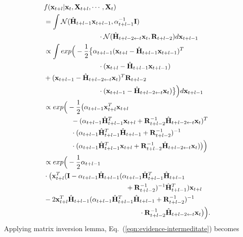 \documentclass[journal]{IEEEtran}
\begin{document}
\begin{equation}\label{eqn:evidence-intermeditate}
    \begin{aligned}&f({\bf{x}}_{t+l}|{\bf{x}}_t,{\bf{X}}_{t+l},\cdots,{\bf{X}}_t)\\
&=\int \mathcal{N}(\hat {\bf{H}}_{t+l-1}{\bf{x}}_{t+l-1},\alpha_{t+l-1}^{-1}{\bf{I}})
\\&\qquad\qquad\qquad\qquad\cdot\mathcal{N}(\hat {\bf{H}}_{t+l-2\leftarrow t}{\bf{x}}_t,{\bf{R}}_{t+l-2})d{\bf{x}}_{t+l-1}
\\&\propto \int 
exp\Big(-{\frac{1}{2}} \big\{\alpha_{t+l-1}({\bf{x}}_{t+l}-
\hat {\bf{H}}_{t+l-1}{\bf{x}}_{t+l-1})^T
\\&\qquad\qquad\qquad\qquad\cdot({\bf{x}}_{t+l}-\hat {\bf{H}}_{t+l-1}{\bf{x}}_{t+l-1})
\\&+({\bf{x}}_{t+l-1}-\hat {\bf{H}}_{t+l-2\leftarrow t}{\bf{x}}_{t})^T{\bf{R}}_{t+l-2}
\\&\qquad\qquad\qquad\qquad\cdot({\bf{x}}_{t+l-1}-\hat {\bf{H}}_{t+l-2\leftarrow t}{\bf{x}}_{t})\big\}\Big)d{\bf{x}}_{t+l-1}
\\&\propto exp\Big(-\frac{1}{2}\big(\alpha_{t+l-1}{\bf{x}}_{t+l}^T{\bf{x}}_{t+l}
\\&\qquad\qquad-(\alpha_{t+l-1}\hat {\bf{H}}_{t+l-1}^T{\bf{x}}_{t+l}+{\bf{R}}_{t+l-2}^{-1}\hat {\bf{H}}_{t+l-2\leftarrow t}{\bf{x}}_t)^T
\\&\qquad\qquad\cdot(\alpha_{t+l-1}\hat {\bf{H}}_{t+l-1}^T\hat {\bf{H}}_{t+l-1}+{\bf{R}}_{t+l-2}^{-1})^{-1}
\\&\qquad\qquad\cdot( \alpha_{t+l-1}\hat {\bf{H}}_{t+l-1}^T{\bf{x}}_{t+l}+{\bf{R}}_{t+l-2}^{-1}\hat {\bf{H}}_{t+l-2\leftarrow t}{\bf{x}}_t)\big)\Big)
\\&\propto exp\Big(-\frac{1}{2}\alpha_{t+l-1}
\\&\cdot\big({\bf{x}}_{t+l}^T({\bf{I}}-\alpha_{t+l-1}\hat {\bf{H}}_{t+l-1}(\alpha_{t+l-1}\hat {\bf{H}}_{t+l-1}^T\hat {\bf{H}}_{t+l-1}
\\&\qquad\qquad \qquad\qquad\qquad\qquad+{\bf{R}}_{t+l-2}^{-1})^{-1}\hat {\bf{H}}_{t+l-1}^T){\bf{x}}_{t+l}
\\&-2{\bf{x}}_{t+l}^T\hat {\bf{H}}_{t+l-1}(\alpha_{t+l-1}\hat {\bf{H}}_{t+l-1}^T\hat {\bf{H}}_{t+l-1}+{\bf{R}}_{t+l-2}^{-1})^{-1}\\&\qquad\qquad\qquad\qquad \qquad\qquad\qquad\cdot {\bf{R}}_{t+l-2}^{-1}\hat {\bf{H}}_{t+l-2\leftarrow t}{\bf{x}}_t\big)\Big).
\end{aligned}
\end{equation}
Applying matrix inversion lemma, Eq.~(\ref{eqn:evidence-intermeditate}) becomes
\end{document}
